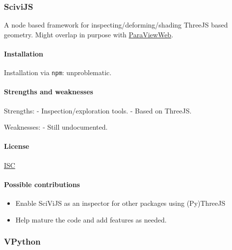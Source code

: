     \hypertarget{scivijs}{%
\subsubsection{SciviJS}\label{scivijs}}

A node based framework for inspecting/deforming/shading ThreeJS based
geometry. Might overlap in purpose with
\href{https://kitware.github.io/paraviewweb/}{ParaViewWeb}.

\hypertarget{installation}{%
\paragraph{Installation}\label{installation}}

Installation via \texttt{npm}: unproblematic.

\hypertarget{strengths-and-weaknesses}{%
\paragraph{Strengths and
weaknesses}\label{strengths-and-weaknesses}}

Strengths: - Inspection/exploration tools. - Based on ThreeJS.

Weaknesses: - Still undocumented.

\hypertarget{license}{%
\paragraph{License}\label{license}}

\href{https://opensource.org/licenses/ISC}{ISC}

\hypertarget{possible-contributions}{%
\paragraph{Possible contributions}\label{possible-contributions}}

\begin{itemize}
\tightlist
\item
  Enable SciViJS as an inspector for other packages using (Py)ThreeJS
\item
  Help mature the code and add features as needed.
\end{itemize}

    \hypertarget{vpython}{%
\subsubsection{VPython}\label{vpython}}

